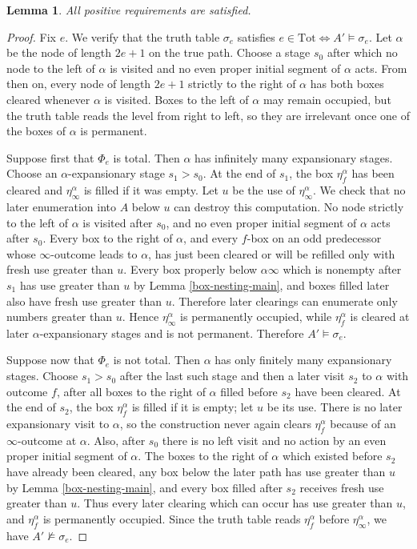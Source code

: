 \documentclass[11pt]{amsart}
\newtheorem{lemma}[theorem]{Lemma}
\begin{document}
\begin{lemma}\label{pos}
All positive requirements are satisfied.
\end{lemma}

\begin{proof}
Fix $e$.  We verify that the truth table $\sigma_e$ satisfies $e\in\mathrm{Tot}\Longleftrightarrow A'\vDash\sigma_e$.
Let $\alpha$ be the node of length $2e+1$ on the true path.  Choose a stage
$s_0$ after which no node to the left of $\alpha$ is visited and no even proper
initial segment of $\alpha$ acts.  From then on, every node of length $2e+1$
strictly to the right of $\alpha$ has both boxes cleared whenever $\alpha$ is
visited.  Boxes to the left of $\alpha$ may remain occupied, but the truth table
reads the level from right to left, so they are irrelevant once one of the boxes
of $\alpha$ is permanent.

Suppose first that $\Phi_e$ is total.  Then $\alpha$ has infinitely many
expansionary stages.  Choose an $\alpha$-expansionary stage $s_1>s_0$.  At the
end of $s_1$, the box $\eta_f^\alpha$ has been cleared and
$\eta_\infty^\alpha$ is filled if it was empty.  Let $u$ be the use of
$\eta_\infty^\alpha$.  We check that no later enumeration into $A$ below $u$ can
destroy this computation.  No node strictly to the left of $\alpha$ is visited
after $s_0$, and no even proper initial segment of $\alpha$ acts after $s_0$.
Every box to the right of $\alpha$, and every $f$-box on an odd predecessor
whose $\infty$-outcome leads to $\alpha$, has just been cleared or will be
refilled only with fresh use greater than $u$.  Every box properly below
$\alpha\infty$ which is nonempty after $s_1$ has use greater than $u$ by Lemma
\ref{box-nesting-main}, and boxes filled later also have fresh use greater than
$u$.  Therefore later clearings can enumerate only numbers greater than $u$.
Hence $\eta_\infty^\alpha$ is permanently occupied, while $\eta_f^\alpha$ is
cleared at later $\alpha$-expansionary stages and is not permanent.  Therefore
$A'\vDash\sigma_e$.

Suppose now that $\Phi_e$ is not total.  Then $\alpha$ has only finitely many
expansionary stages.  Choose $s_1>s_0$ after the last such stage and then a
later visit $s_2$ to $\alpha$ with outcome $f$, after all boxes to the right of
$\alpha$ filled before $s_2$ have been cleared.  At the end of $s_2$, the box
$\eta_f^\alpha$ is filled if it is empty; let $u$ be its use.  There is no later
expansionary visit to $\alpha$, so the construction never again clears
$\eta_f^\alpha$ because of an $\infty$-outcome at $\alpha$.  Also, after $s_0$
there is no left visit and no action by an even proper initial segment of
$\alpha$.  The boxes to the right of $\alpha$ which existed before $s_2$ have
already been cleared, any box below the later path has use greater than $u$ by
Lemma \ref{box-nesting-main}, and every box filled after $s_2$ receives fresh
use greater than $u$.  Thus every later clearing which can occur has use greater
than $u$, and $\eta_f^\alpha$ is permanently occupied.  Since the truth table
reads $\eta_f^\alpha$ before $\eta_\infty^\alpha$, we have
$A'\nvDash\sigma_e$.
\end{proof}
\end{document}
